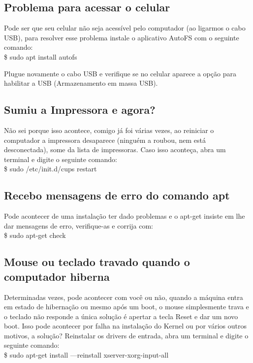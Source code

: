 \subsection{Problema para acessar o celular}
Pode ser que seu celular não seja acessível pelo computador (ao ligarmos o cabo USB), para resolver esse problema instale o aplicativo AutoFS com o seguinte comando: \\
{\ttfamily\$ sudo apt install autofs}

Plugue novamente o cabo USB e verifique se no celular aparece a opção para habilitar a USB (Armazenamento em massa USB).

\subsection{Sumiu a Impressora e agora?}
Não sei porque isso acontece, comigo já foi várias vezes, ao reiniciar o computador a impressora desaparece (ninguém a roubou, nem está desconectada), some da lista de impressoras. Caso isso aconteça, abra um terminal e digite o seguinte comando: \\
{\ttfamily\$ sudo /etc/init.d/cups restart}

\subsection{Recebo mensagens de erro do comando apt}
Pode acontecer de uma instalação ter dado problemas e o apt-get insiste em lhe dar mensagens de erro, verifique-as e corrija com: \\
{\ttfamily\$ sudo apt-get check}

\subsection{Mouse ou teclado travado quando o computador hiberna}
Determinadas vezes, pode acontecer com você ou não, quando a máquina entra em estado de hibernação ou mesmo após um boot, o mouse simplesmente trava e o teclado não responde a única solução é apertar a tecla Reset e dar um novo boot. Isso pode acontecer por falha na instalação do Kernel ou por vários outros motivos, a solução? Reinstalar os drivers de entrada, abra um terminal e digite o seguinte comando: \\
{\ttfamily\$ sudo apt-get install ---reinstall xserver-xorg-input-all}


